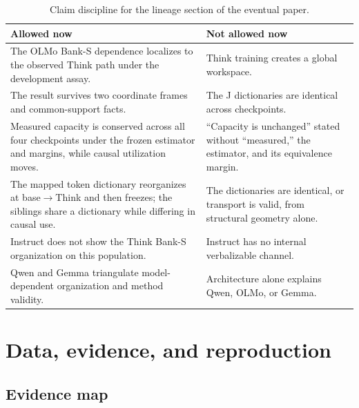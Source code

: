\documentclass[11pt]{article}
\begin{document}
\begin{table}[H]
\centering\small
\begin{tabularx}{\textwidth}{@{}X X@{}}
\toprule
\textbf{Allowed now} & \textbf{Not allowed now}\\
\midrule
The OLMo Bank-S dependence localizes to the observed Think path under the development assay. & Think training creates a global workspace.\\
The result survives two coordinate frames and common-support facts. & The J dictionaries are identical across checkpoints.\\
Measured capacity is conserved across all four checkpoints under the frozen estimator and margins, while causal utilization moves. & ``Capacity is unchanged'' stated without ``measured,'' the estimator, and its equivalence margin.\\
The mapped token dictionary reorganizes at base$\to$Think and then freezes; the siblings share a dictionary while differing in causal use. & The dictionaries are identical, or transport is valid, from structural geometry alone.\\
Instruct does not show the Think Bank-S organization on this population. & Instruct has no internal verbalizable channel.\\
Qwen and Gemma triangulate model-dependent organization and method validity. & Architecture alone explains Qwen, OLMo, or Gemma.\\
\bottomrule
\end{tabularx}
\caption{Claim discipline for the lineage section of the eventual paper.}
\end{table}

\section{Data, evidence, and reproduction}\label{sec:repro}

\subsection{Evidence map}
\end{document}
